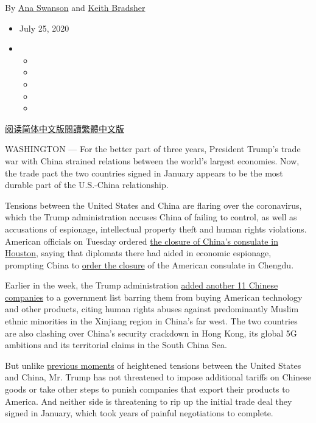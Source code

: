 By \href{https://www.nytimes.com/by/ana-swanson}{Ana Swanson} and
\href{https://www.nytimes.com/by/keith-bradsher}{Keith Bradsher}

\begin{itemize}
\item
  July 25, 2020
\item
  \begin{itemize}
  \item
  \item
  \item
  \item
  \item
  \end{itemize}
\end{itemize}

\href{https://cn.nytimes.com/business/20200727/us-china-trade-diplomacy/}{阅读简体中文版}\href{https://cn.nytimes.com/business/20200727/us-china-trade-diplomacy/zh-hant/}{閱讀繁體中文版}

WASHINGTON --- For the better part of three years, President Trump's
trade war with China strained relations between the world's largest
economies. Now, the trade pact the two countries signed in January
appears to be the most durable part of the U.S.-China relationship.

Tensions between the United States and China are flaring over the
coronavirus, which the Trump administration accuses China of failing to
control, as well as accusations of espionage, intellectual property
theft and human rights violations. American officials on Tuesday ordered
\href{https://www.nytimes.com/2020/07/22/world/asia/us-china-houston-consulate.html}{the
closure of China's consulate in Houston}, saying that diplomats there
had aided in economic espionage, prompting China to
\href{https://www.nytimes.com/2020/07/24/world/asia/china-us-consulate-chengdu.html}{order
the closure} of the American consulate in Chengdu.

Earlier in the week, the Trump administration
\href{https://www.nytimes.com/2020/07/20/business/economy/china-sanctions-uighurs-labor.html}{added
another 11 Chinese companies} to a government list barring them from
buying American technology and other products, citing human rights
abuses against predominantly Muslim ethnic minorities in the Xinjiang
region in China's far west. The two countries are also clashing over
China's security crackdown in Hong Kong, its global 5G ambitions and its
territorial claims in the South China Sea.

But unlike
\href{https://www.nytimes.com/2019/08/23/business/china-tariffs-trump.html}{previous
moments} of heightened tensions between the United States and China, Mr.
Trump has not threatened to impose additional tariffs on Chinese goods
or take other steps to punish companies that export their products to
America. And neither side is threatening to rip up the initial trade
deal they signed in January, which took years of painful negotiations to
complete.


